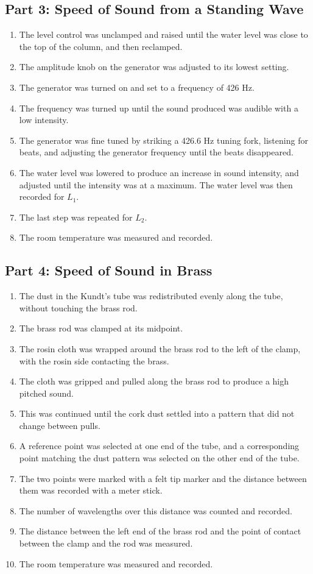 \documentclass[twocolumn,english]{IEEEtran}
\theoremstyle{plain}
\theoremstyle{plain}
\begin{document}
\subsection*{Part 3: Speed of Sound from a Standing Wave}
\begin{enumerate}
 \item The level control was unclamped and raised until the water level was close to the top of the column, and then reclamped.
 \item The amplitude knob on the generator was adjusted to its lowest setting.
 \item The generator was turned on and set to a frequency of 426 Hz.
 \item The frequency was turned up until the sound produced was audible with a low intensity.
 \item The generator was fine tuned by striking a 426.6 Hz tuning fork, listening for beats, and adjusting the generator frequency until the beats disappeared.
 \item The water level was lowered to produce an increase in sound intensity, and adjusted until the intensity was at a maximum. The water level was then recorded for $L_1$.
 \item The last step was repeated for $L_2$.
 \item The room temperature was measured and recorded.
\end{enumerate}

\subsection*{Part 4: Speed of Sound in Brass}
\begin{enumerate}
 \item The dust in the Kundt's tube was redistributed evenly along the tube, without touching the brass rod.
 \item The brass rod was clamped at its midpoint. %
 \item The rosin cloth was wrapped around the brass rod to the left of the clamp, with the rosin side contacting the brass.
 \item The cloth was gripped and pulled along the brass rod to produce a high pitched sound.
 \item This was continued until the cork dust settled into a pattern that did not change between pulls.
 \item A reference point was selected at one end of the tube, and a corresponding point matching the dust pattern was selected on the other end of the tube.
 \item The two points were marked with a felt tip marker and the distance between them was recorded with a meter stick.
 \item The number of wavelengths over this distance was counted and recorded.
 \item The distance between the left end of the brass rod and the point of contact between the clamp and the rod was measured.
 \item The room temperature was measured and recorded.
\end{enumerate}
\end{document}
